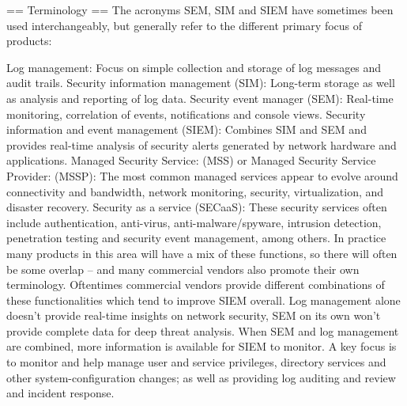 == Terminology ==
The acronyms SEM, SIM and SIEM have sometimes been used interchangeably, but generally refer to the different primary focus of products:

Log management: Focus on simple collection and storage of log messages and audit trails.
Security information management (SIM): Long-term storage as well as analysis and reporting of log data.
Security event manager (SEM): Real-time monitoring, correlation of events, notifications and console views.
Security information and event management (SIEM): Combines SIM and SEM and provides real-time analysis of security alerts generated by network hardware and applications.
Managed Security Service: (MSS) or Managed Security Service Provider: (MSSP): The most common managed services appear to evolve around connectivity and bandwidth, network monitoring, security, virtualization, and disaster recovery.
Security as a service (SECaaS): These security services often include authentication, anti-virus, anti-malware/spyware, intrusion detection, penetration testing and security event management, among others.
In practice many products in this area will have a mix of these functions, so there will often be some overlap – and many commercial vendors also promote their own terminology. Oftentimes commercial vendors provide different combinations of these functionalities which tend to improve SIEM overall. Log management alone doesn't provide real-time insights on network security, SEM on its own won't provide complete data for deep threat analysis. When SEM and log management are combined, more information is available for SIEM to monitor.
A key focus is to monitor and help manage user and service privileges, directory services and other system-configuration changes; as well as providing log auditing and review and incident response.



